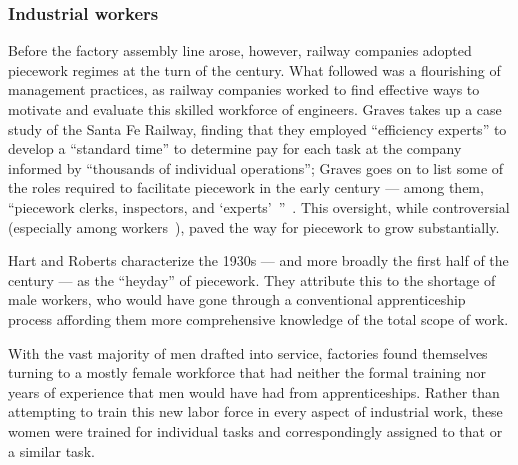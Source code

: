 \documentclass[pn4226]{subfiles}
\begin{document}
\subsubsection{Industrial workers}
Before the factory assembly line arose, however, railway companies adopted piecework regimes at the turn of the  century.
What followed was a flourishing of management practices,
as railway companies worked to find effective ways
to motivate and evaluate this skilled workforce of engineers.
Graves takes up a case study of the Santa Fe Railway,
finding that they employed ``efficiency experts'' to develop a ``standard time''
to determine pay for each task at the company informed by
``thousands of individual operations'';
Graves goes on to list
some of the roles required to facilitate piecework
in the early  century
--- among them, ``piecework clerks, inspectors, and `experts'~''~\cite{10.2307/23702539}.
This oversight, while controversial
(especially among workers~\cite{american1921problem}),
paved the way for piecework to grow substantially.

Hart and Roberts characterize the 1930s
--- and more broadly the first half of the  century ---
as the ``heyday'' of piecework.
They attribute this to the shortage of male workers,
who would have gone through a conventional apprenticeship process
affording them more comprehensive knowledge of the total scope of work.

With the vast majority of men drafted into service,
factories found themselves turning to
a mostly female workforce that had neither
the formal training nor
years of experience that men would have had from apprenticeships.
Rather than attempting to train this new labor force in every aspect of industrial work,
these women were trained for individual tasks
and correspondingly assigned to that or a similar task.

\begin{comment}
What did I pull from the threads that are related to industrial and railroad workers (i.e. 1920 onward?)

- Graves: railway companies used ``efficiency experts'' to study how long tasks should take
- Hart: evaluation limits complexity (we can affect that with peer evaluation!)
- Graves: sparks of Scientific Management in Piecework
- organization types are important determinants of piecework viability: lots of types of tasks? bad
  - Hart (I think?): variability in *worker* quality is fine
- Foreman is important
- Worker advocacy groups arose to speak out against piecework

\end{comment}



\onlyinsubfile{


}
\end{document}
